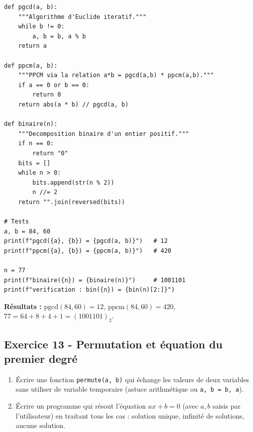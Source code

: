\documentclass[12pt,a4paper]{article}
\begin{document}
\begin{boitecorrige}
\begin{lstlisting}
def pgcd(a, b):
    """Algorithme d'Euclide iteratif."""
    while b != 0:
        a, b = b, a % b
    return a

def ppcm(a, b):
    """PPCM via la relation a*b = pgcd(a,b) * ppcm(a,b)."""
    if a == 0 or b == 0:
        return 0
    return abs(a * b) // pgcd(a, b)

def binaire(n):
    """Decomposition binaire d'un entier positif."""
    if n == 0:
        return "0"
    bits = []
    while n > 0:
        bits.append(str(n % 2))
        n //= 2
    return "".join(reversed(bits))

# Tests
a, b = 84, 60
print(f"pgcd({a}, {b}) = {pgcd(a, b)}")   # 12
print(f"ppcm({a}, {b}) = {ppcm(a, b)}")   # 420

n = 77
print(f"binaire({n}) = {binaire(n)}")     # 1001101
print(f"verification : bin({n}) = {bin(n)[2:]}")
\end{lstlisting}

\textbf{Résultats :} $\mathrm{pgcd}(84,60)=12$, $\mathrm{ppcm}(84,60)=420$, $77 = 64+8+4+1 = (1001101)_2$.
\end{boitecorrige}

\subsection*{Exercice 13 - Permutation et équation du premier degré \niveau{\facile}}

\begin{boiteexercice}
\begin{enumerate}
  \item Écrire une fonction \texttt{permute(a, b)} qui échange les valeurs de deux variables sans utiliser de variable temporaire (astuce arithmétique ou \texttt{a, b = b, a}).
  \item Écrire un programme qui résout l'équation $ax + b = 0$ (avec $a, b$ saisis par l'utilisateur) en traitant tous les cas : solution unique, infinité de solutions, aucune solution.
\end{enumerate}
\end{boiteexercice}
\end{document}
